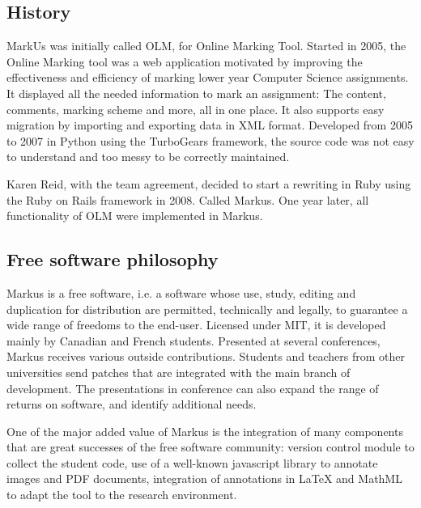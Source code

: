 \documentclass[twocolumn,10pt]{asme2e}
\begin{document}

\subsection*{History}


MarkUs was initially called OLM, for Online Marking Tool. Started in 2005, the
Online Marking tool was a web application motivated by improving the
effectiveness and efficiency of marking lower year Computer Science
assignments. It displayed all the needed information to mark an assignment:
The content, comments, marking scheme and more, all in one place. It also
supports easy migration by importing and exporting data in XML format.
Developed from 2005 to 2007 in Python using the TurboGears framework, 
the source code was not easy to understand and too messy to be correctly maintained.

Karen Reid, with the team agreement, decided to start a rewriting in Ruby using the Ruby on Rails framework in 2008. Called Markus. One year later, all functionality of OLM were implemented in Markus.


\subsection*{Free software philosophy}
Markus is a free software, i.e. a software whose use, study, editing and duplication for distribution are permitted, technically and legally, to guarantee a wide range of freedoms to the end-user. Licensed under MIT, it is developed mainly by Canadian and French students.
Presented at several conferences, Markus receives various outside contributions. Students and teachers from other universities send patches that are integrated with the main branch of development. The presentations in conference can also expand the range of returns on software, and identify additional needs.

One of the major added value of Markus is the integration of many components that are great successes of the free software community: version control module to collect the student code, use of a well-known javascript library to annotate images and PDF documents, integration of annotations in LaTeX and MathML to adapt the tool to the research environment. 
\end{document}
